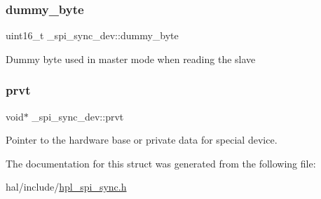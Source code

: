 \subsubsection{\texorpdfstring{dummy\+\_\+byte}{dummy\_byte}}
{\footnotesize\ttfamily uint16\+\_\+t \+\_\+spi\+\_\+sync\+\_\+dev\+::dummy\+\_\+byte}

Dummy byte used in master mode when reading the slave \mbox{\label{struct__spi__sync__dev_acff7c75825e3cfabf015372ad55dc035}} 
\subsubsection{\texorpdfstring{prvt}{prvt}}
{\footnotesize\ttfamily void$\ast$ \+\_\+spi\+\_\+sync\+\_\+dev\+::prvt}

Pointer to the hardware base or private data for special device. 

The documentation for this struct was generated from the following file\+:\begin{DoxyCompactItemize}
\item 
hal/include/\hyperlink{hpl__spi__sync_8h}{hpl\+\_\+spi\+\_\+sync.\+h}\end{DoxyCompactItemize}
